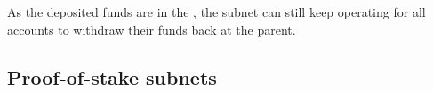 As the deposited funds are in the \sa, the subnet can still keep operating for all accounts to withdraw their funds back at the parent. 


\subsection{Proof-of-stake subnets}
\label{sec:pos-subnets}


